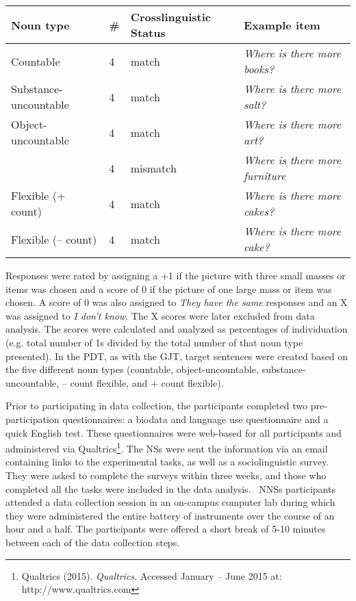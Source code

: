 \documentclass[12pt]{article}
\newenvironment{styleStandard}{\setlength\leftskip{0cm}\setlength\rightskip{0cm plus 1fil}\setlength\parindent{0cm}\setlength\parfillskip{0pt plus 1fil}\setlength\parskip{0in plus 1pt}\writerlistparindent\writerlistleftskip\leavevmode\normalfont\normalsize\writerlistlabel\ignorespaces}{\unskip\vspace{0.111in plus 0.0111in}\par}
\newcommand\writerlistleftskip{}
\newcommand\writerlistparindent{}
\newcommand\writerlistlabel{}
\begin{document}
\begin{center}
\tablehead{}
\begin{supertabular}{|m{1.6809598in}|m{0.35525984in}|m{1.1254599in}|m{1.6941599in}|}
\hline
\textbf{Noun type} &
\textbf{\#} &
\textbf{Crosslinguistic Status} &
\textbf{Example item}\\\hline
Countable &
4 &
match &
\textit{Where is there more books?}\\\hline
Substance-uncountable &
4 &
match &
\textit{Where is there more salt?}\\\hline
Object-uncountable &
4 &
match &
\textit{Where is there more art?}\\\hhline{~---}
 &
4 &
mismatch &
\textit{Where is there more furniture}\\\hhline{~---}
Flexible (+ count) &
4 &
match &
\textit{Where is there more cakes?}\\\hline
Flexible (– count) &
4 &
match &
\textit{Where is there more cake?}\\\hline
\end{supertabular}
\end{center}
\begin{styleStandard}
Responses were rated by assigning a +1 if the picture with three small masses or items was chosen and a score of 0 if the picture of one large mass or item was chosen. A score of 0 was also assigned to \textit{They have the same} responses and an X was assigned to \textit{I don’t know}. The X scores were later excluded from data analysis. The scores were calculated and analyzed as percentages of individuation (e.g. total number of 1s divided by the total number of that noun type presented). In the PDT, as with the GJT, target sentences were created based on the five different noun types (countable, object-uncountable, substance-uncountable, – count flexible, and + count flexible). 
\end{styleStandard}

\begin{styleStandard}
Prior to participating in data collection, the participants completed two pre-participation questionnaires: a biodata and language use questionnaire and a quick English test. These questionnaires were web-based for all participants and administered via Qualtrics\footnote{ Qualtrics (2015). \textit{Qualtrics.} Accessed January – June 2015 at: http://www.qualtrics.com}. The NSs were sent the information via an email containing links to the experimental tasks, as well as a sociolinguistic survey. They were asked to complete the surveys within three weeks, and those who completed all the tasks were included in the data analysis. \ NNSs participants attended a data collection session in an on-campus computer lab during which they were administered the entire battery of instruments over the course of an hour and a half. The participants were offered a short break of 5-10 minutes between each of the data collection steps. 
\end{styleStandard}
\end{document}
